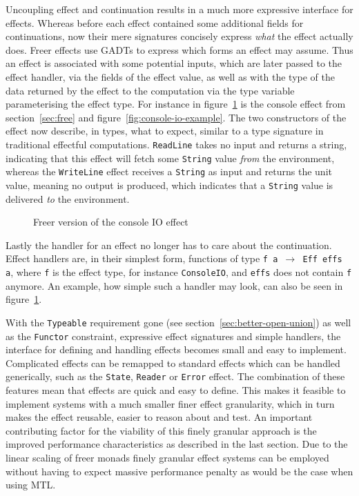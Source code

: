 Uncoupling effect and continuation results in a much more expressive interface
for effects. Whereas before each effect contained some additional fields for
continuations, now their mere signatures concisely express \emph{what} the
effect actually does. Freer effects use GADTs to express which forms an effect
may assume. Thus an effect is associated with some potential inputs, which are
later passed to the effect handler, via the fields of the effect value, as well
as with the type of the data returned by the effect to the computation via the
type variable parameterising the effect type. For instance in
figure~\ref{fig:console-io-freer} is the console effect from
section~\ref{sec:free} and figure~\ref{fig:console-io-example}. The two
constructors of the effect now describe, in types, what to expect, similar to a
type signature in traditional effectful computations. \texttt{ReadLine} takes no
input and returns a string, indicating that this effect will fetch some
\texttt{String} value \emph{from} the environment, whereas the
\texttt{WriteLine} effect receives a \texttt{String} as input and returns the
unit value, meaning no output is produced, which indicates that a
\texttt{String} value is delivered \emph{to} the environment.

\begin{figure}
  
  \caption{Freer version of the console IO effect}
  \label{fig:console-io-freer}
\end{figure}

Lastly the handler for an effect no longer has to care about the continuation.
Effect handlers are, in their simplest form, functions of type \texttt{f a $\rightarrow$
  Eff effs a}, where \texttt{f} is the effect type, for instance
\texttt{ConsoleIO}, and \texttt{effs} does not contain \texttt{f} anymore. An
example, how simple such a handler may look, can also be seen in
figure~\ref{fig:console-io-freer}.

With the \texttt{Typeable} requirement gone (see
section~\ref{sec:better-open-union}) as well as the \texttt{Functor} constraint,
expressive effect signatures and simple handlers, the interface for defining and
handling effects becomes small and easy to implement. Complicated effects can be
remapped to standard effects which can be handled generically, such as the
\texttt{State}, \texttt{Reader} or \texttt{Error} effect. The combination of
these features mean that effects are quick and easy to define. This makes it
feasible to implement systems with a much smaller finer effect granularity,
which in turn makes the effect reusable, easier to reason about and test. An
important contributing factor for the viability of this finely granular approach
is the improved performance characteristics as described in the last section.
Due to the linear scaling of freer monads finely granular effect systems can be
employed without having to expect massive performance penalty as would be the
case when using MTL.


